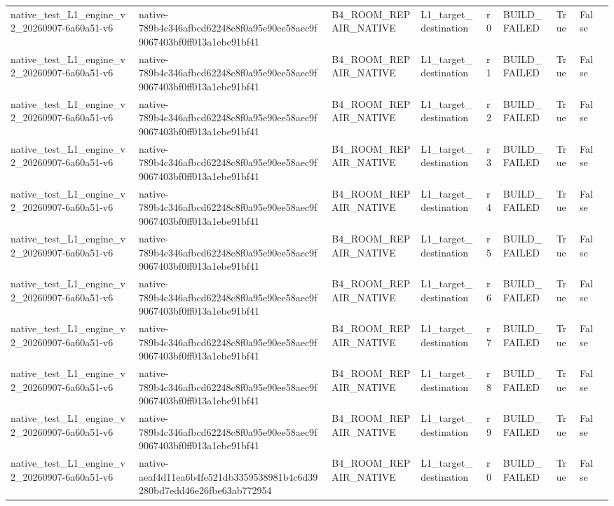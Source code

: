 \begin{tabular}{lllllllll}
native\_test\_L1\_engine\_v2\_20260907-6a60a51-v6 & native-789b4c346afbcd62248c8f0a95e90ee58aec9f9067403bf0ff013a1ebe91bf41 & B4\_ROOM\_REPAIR\_NATIVE & L1\_target\_destination & r0 & BUILD\_FAILED & True & False &  \\
native\_test\_L1\_engine\_v2\_20260907-6a60a51-v6 & native-789b4c346afbcd62248c8f0a95e90ee58aec9f9067403bf0ff013a1ebe91bf41 & B4\_ROOM\_REPAIR\_NATIVE & L1\_target\_destination & r1 & BUILD\_FAILED & True & False &  \\
native\_test\_L1\_engine\_v2\_20260907-6a60a51-v6 & native-789b4c346afbcd62248c8f0a95e90ee58aec9f9067403bf0ff013a1ebe91bf41 & B4\_ROOM\_REPAIR\_NATIVE & L1\_target\_destination & r2 & BUILD\_FAILED & True & False &  \\
native\_test\_L1\_engine\_v2\_20260907-6a60a51-v6 & native-789b4c346afbcd62248c8f0a95e90ee58aec9f9067403bf0ff013a1ebe91bf41 & B4\_ROOM\_REPAIR\_NATIVE & L1\_target\_destination & r3 & BUILD\_FAILED & True & False &  \\
native\_test\_L1\_engine\_v2\_20260907-6a60a51-v6 & native-789b4c346afbcd62248c8f0a95e90ee58aec9f9067403bf0ff013a1ebe91bf41 & B4\_ROOM\_REPAIR\_NATIVE & L1\_target\_destination & r4 & BUILD\_FAILED & True & False &  \\
native\_test\_L1\_engine\_v2\_20260907-6a60a51-v6 & native-789b4c346afbcd62248c8f0a95e90ee58aec9f9067403bf0ff013a1ebe91bf41 & B4\_ROOM\_REPAIR\_NATIVE & L1\_target\_destination & r5 & BUILD\_FAILED & True & False &  \\
native\_test\_L1\_engine\_v2\_20260907-6a60a51-v6 & native-789b4c346afbcd62248c8f0a95e90ee58aec9f9067403bf0ff013a1ebe91bf41 & B4\_ROOM\_REPAIR\_NATIVE & L1\_target\_destination & r6 & BUILD\_FAILED & True & False &  \\
native\_test\_L1\_engine\_v2\_20260907-6a60a51-v6 & native-789b4c346afbcd62248c8f0a95e90ee58aec9f9067403bf0ff013a1ebe91bf41 & B4\_ROOM\_REPAIR\_NATIVE & L1\_target\_destination & r7 & BUILD\_FAILED & True & False &  \\
native\_test\_L1\_engine\_v2\_20260907-6a60a51-v6 & native-789b4c346afbcd62248c8f0a95e90ee58aec9f9067403bf0ff013a1ebe91bf41 & B4\_ROOM\_REPAIR\_NATIVE & L1\_target\_destination & r8 & BUILD\_FAILED & True & False &  \\
native\_test\_L1\_engine\_v2\_20260907-6a60a51-v6 & native-789b4c346afbcd62248c8f0a95e90ee58aec9f9067403bf0ff013a1ebe91bf41 & B4\_ROOM\_REPAIR\_NATIVE & L1\_target\_destination & r9 & BUILD\_FAILED & True & False &  \\
native\_test\_L1\_engine\_v2\_20260907-6a60a51-v6 & native-aeaf4d11ea6b4fe521db3359538981b4c6d39280bd7edd46e26fbe63ab772954 & B4\_ROOM\_REPAIR\_NATIVE & L1\_target\_destination & r0 & BUILD\_FAILED & True & False &  \\

\end{tabular}
